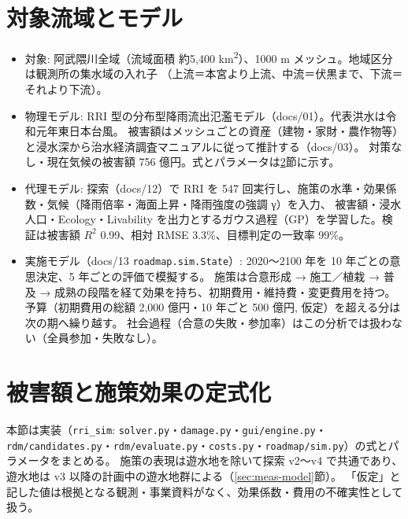 \documentclass[a4paper,10pt]{ltjsarticle}
\begin{document}
\section{対象流域とモデル}
\label{sec:model}

\begin{itemize}
  \item 対象: 阿武隈川全域（流域面積 約5,400 km\textsuperscript{2}）、1000 m メッシュ。地域区分は観測所の集水域の入れ子
    （上流＝本宮より上流、中流＝伏黒まで、下流＝それより下流）。
  \item 物理モデル: RRI 型の分布型降雨流出氾濫モデル\cite{sayama2012}（docs/01）。代表洪水は令和元年東日本台風。
    被害額はメッシュごとの資産（建物・家財・農作物等）と浸水深から治水経済調査マニュアル\cite{mlit_manual}に従って推計する（docs/03）。
    対策なし・現在気候の被害額 756 億円。式とパラメータは\ref{sec:formulation}節に示す。
  \item 代理モデル: 探索（docs/12）で RRI を 547 回実行し、施策の水準・効果係数・気候（降雨倍率・海面上昇・降雨強度の強調 γ）を入力、
    被害額・浸水人口・Ecology・Livability を出力とするガウス過程（GP）を学習した。検証は被害額 $R^2$ 0.99、相対 RMSE 3.3\%、目標判定の一致率 99\%。
  \item 実施モデル（docs/13 \texttt{roadmap.sim.State}）: 2020〜2100 年を 10 年ごとの意思決定、5 年ごとの評価で模擬する。
    施策は合意形成 → 施工／植栽 → 普及 → 成熟の段階を経て効果を持ち、初期費用・維持費・変更費用を持つ。予算（初期費用の総額 2,000 億円・10 年ごと 500 億円, 仮定）を超える分は次の期へ繰り越す。
    社会過程（合意の失敗・参加率）はこの分析では扱わない（全員参加・失敗なし）。
\end{itemize}

\section{被害額と施策効果の定式化}
\label{sec:formulation}

本節は実装（\texttt{rri\_sim}: \texttt{solver.py}・\texttt{damage.py}・\texttt{gui/engine.py}・\texttt{rdm/candidates.py}・\texttt{rdm/evaluate.py}・\texttt{costs.py}・\texttt{roadmap/sim.py}）の式とパラメータをまとめる。
施策の表現は遊水地を除いて探索 v2〜v4 で共通であり、遊水地は v3 以降の計画中の遊水地群による（\ref{sec:meas-model}節）。
「仮定」と記した値は根拠となる観測・事業資料がなく、効果係数・費用の不確実性として扱う。
\end{document}
